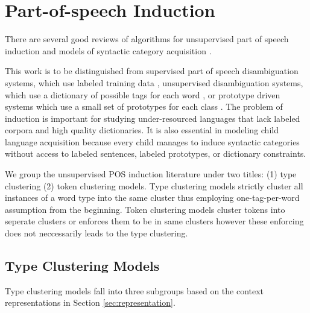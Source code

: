 \section{Part-of-speech Induction}
\label{sec:related}

There are several good reviews of algorithms for unsupervised part of
speech induction
\cite{Christodoulopoulos:2010:TDU:1870658.1870714,Gao:2008:CBE:1613715.1613761}
and models of syntactic category acquisition \cite{ambridge2011child}.

This work is to be distinguished from supervised part of speech
disambiguation systems, which use labeled training data
\cite{Toutanova:2003:FPT:1073445.1073478}, unsupervised disambiguation
systems, which use a dictionary of possible tags for each word
\cite{yatbaz-yuret:2010:POSTERS}, or prototype driven systems which
use a small set of prototypes for each class
\cite{Haghighi:2006:PLS:1220835.1220876}.  The problem of induction is
important for studying under-resourced languages that lack labeled
corpora and high quality dictionaries.  It is also essential in
modeling child language acquisition because every child manages to
induce syntactic categories without access to labeled sentences,
labeled prototypes, or dictionary constraints.

We group the unsupervised POS induction literature under two titles:
(1) type clustering (2) token clustering models.  Type clustering
models strictly cluster all instances of a word type into the same
cluster thus employing one-tag-per-word assumption from the beginning.
Token clustering models cluster tokens into seperate clusters or
enforces them to be in same clusters however these enforcing does not
neccessarily leads to the type clustering.

\subsection{Type Clustering Models}

Type clustering models fall into three subgroups based on the context
representations in Section \ref{sec:representation}.  

